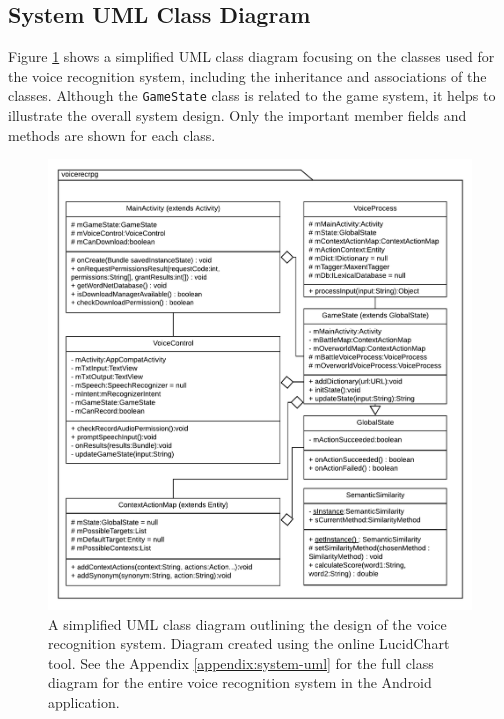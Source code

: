 \documentclass[11pt]{article}
\begin{document}
\subsection{System UML Class Diagram}

Figure \ref{fig:system-overview} shows a simplified UML class diagram focusing on the classes used for the voice recognition system, including the inheritance and associations of the classes. Although the \texttt{GameState} class is related to the game system, it helps to illustrate the overall system design. Only the important member fields and methods are shown for each class.

\begin{center}
\begin{figure}[H]
\begin{center}
  \includegraphics[width=\linewidth]{system-overview.pdf}
  \caption{A simplified UML class diagram outlining the design of the voice recognition system. Diagram created using the online LucidChart tool. See the Appendix \ref{appendix:system-uml} for the full class diagram for the entire voice recognition system in the Android application.}
  \label{fig:system-overview}
  \end{center}
\end{figure}
\end{center}
\end{document}
